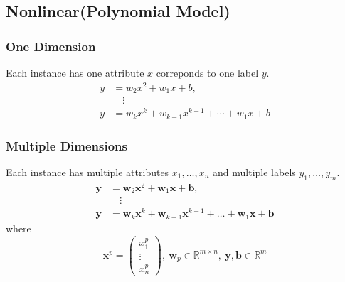 \documentclass{article}
\begin{document}
        \subsection{Nonlinear(Polynomial Model)}
            \subsubsection{One Dimension}
                Each instance has one attribute $x$ correponds to one label $y$.
                \begin{align*}
                    y&=w_2x^2+w_1x+b, \\
                    &\quad \vdots\\
                    y&=w_kx^k+w_{k-1}x^{k-1}+\cdots+w_1x+b
                \end{align*}
            \subsubsection{Multiple Dimensions}
                Each instance has multiple attributes $x_1,\dots,x_n$ and multiple labels $y_1,\dots,y_m$.
                \begin{align*}
                    \boldsymbol{y}&=\boldsymbol{w}_2\boldsymbol{x}^2+\boldsymbol{w}_1\boldsymbol{x}+\boldsymbol{b}, \\
                    &\quad \vdots\\
                    \boldsymbol{y}&=\boldsymbol{w}_k\boldsymbol{x}^k+\boldsymbol{w}_{k-1}\boldsymbol{x}^{k-1}+\dots+\boldsymbol{w}_1\boldsymbol{x}+\boldsymbol{b}
                \end{align*}
            where
                \[
                    \boldsymbol{x}^p=\left(\begin{array}{c}
                        x_1^p\\
                        \vdots\\
                        x_n^p
                    \end{array}\right),~
                    \boldsymbol{w}_p \in \mathbb{R}^{m \times n},~
                    \boldsymbol{y}, \boldsymbol{b} \in \mathbb{R}^m
                \]
\end{document}
